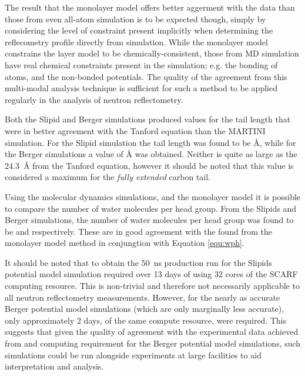 \documentclass[amsmath,amssymb,twocolumn,superscriptaddress]{revtex4-1}
\begin{document}
The result that the monolayer model offers better aggerment with the data than
those from even all-atom simulation is to be expected though, simply by
considering the level of constraint present implicitly when determining the
reflecometry profile directly from simulation.
While the monolayer model constrains the layer model to be
chemically-consistent, those from MD simulation have real chemical
constraints present in the simulation; e.g. the bonding of atoms, and
the non-bonded potentials.
The quality of the agreement from this multi-modal analysis technique
is sufficient for such a method to be applied regularly in the analysis
of neutron reflectometry.

Both the Slipid and Berger simulations produced values for the tail length
that were in better agreement with the Tanford equation than the
MARTINI simulation.
For the Slipid simulation the tail length was found to be
\si{\angstrom}, while for the
Berger simulations a value of
\si{\angstrom} was obtained.
Neither is quite as large as the \SI{24.3}{\angstrom} from the Tanford
equation, however it should be noted that this value is considered a
maximum for the \emph{fully extended} carbon tail.

Using the molecular dynamics simulations, and the monolayer model it is
possible to compare the number of water molecules per head group.
From the Slipids and Berger simulations, the number of water molecules per
head group was found to be 
and  respectively.
These are in good agreement with the
 found from the monolayer model
method in conjungtion with Equation \ref{equ:wph}.

It should be noted that to obtain the \SI{50}{\nano\second} production run
for the Slipids potential model simulation required over 13 days of using 32
cores of the SCARF computing resource.
This is non-trivial and therefore not necessarily applicable to all neutron
reflectometry measurements.
However, for the nearly as accurate Berger potential model simulations
(which are only marginally less accurate), only approximately 2 days, of the
same compute resource, were required.
This suggests that given the quality of agreement with the experimental data
achieved from and computing requirement for the Berger potential model
simulations, such simulations could be run alongside experiments at large
facilities to aid interpretation and analysis.
\end{document}
